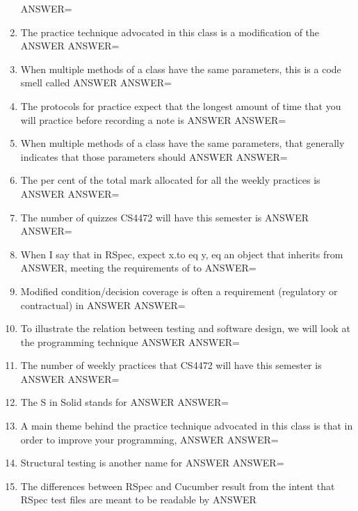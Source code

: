 \documentclass{exam}
\begin{document}
\begin{enumerate}
ANSWER=
\item The practice technique advocated in this class is a modification of the ANSWER\newline
ANSWER=
\item When multiple methods of a class have the same parameters, this is a code smell called ANSWER\newline
ANSWER=
\item The protocols for practice expect that the longest amount of time that you will practice before recording a note is ANSWER\newline
ANSWER=
\item When multiple methods of a class have the same parameters, that generally indicates that those parameters should ANSWER\newline
ANSWER=
\item The per cent of the total mark allocated for all the weekly practices is ANSWER\newline
ANSWER=
\item The number of quizzes CS4472 will have this semester is ANSWER\newline
ANSWER=
\item When I say that in RSpec, expect x.to eq y, eq an object that inherits from ANSWER, meeting the requirements of to\newline
ANSWER=
\item Modified condition/decision coverage is often a requirement (regulatory or contractual) in ANSWER\newline
ANSWER=
\item To illustrate the relation between testing and software design, we will look at the programming technique ANSWER\newline
ANSWER=
\item The number of weekly practices that CS4472 will have this semester is ANSWER\newline
ANSWER=
\item The S in Solid stands for ANSWER\newline
ANSWER=
\item A main theme behind the practice technique advocated in this class is that in order to improve your programming, ANSWER\newline
ANSWER=
\item Structural testing is another name for ANSWER\newline
ANSWER=
\item The differences between RSpec and Cucumber result from the intent that RSpec test files are meant to be readable by ANSWER\newline

\end{enumerate}
\end{document}
